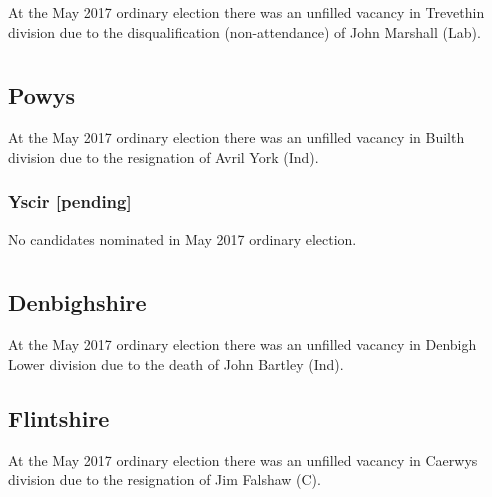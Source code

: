 \documentclass[a4paper,openany]{book}
\begin{document}
\begin{resultsiii}
At the May 2017 ordinary election there was an unfilled vacancy in Trevethin division due to the disqualification (non-attendance) of John Marshall (Lab).

\section[Mid and West Wales]{}

\subsection*{Powys}

At the May 2017 ordinary election there was an unfilled vacancy in Builth division due to the resignation of Avril York (Ind).

\subsubsection*{Yscir \hspace*{\fill}\nolinebreak[1]%
\enspace\hspace*{\fill}
[pending]}


No candidates nominated in May 2017 ordinary election.

\section[North Wales]{}

\subsection*{Denbighshire}

At the May 2017 ordinary election there was an unfilled vacancy in Denbigh Lower division due to the death of John Bartley (Ind).

\subsection*{Flintshire}

At the May 2017 ordinary election there was an unfilled vacancy in Caerwys division due to the resignation of Jim Falshaw (C).


\end{resultsiii}
\end{document}
